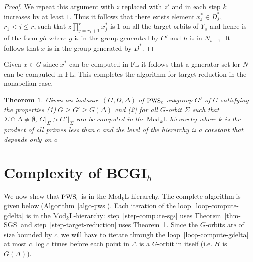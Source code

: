 \documentclass[11pt]{madras}%
\newtheorem{theorem}{Theorem}[chapter]
\theoremstyle{remark}
\newcommand{\ModkL}[1]{{\ensuremath{\mathrm{Mod}_{#1}\mathrm{L}}}}
\newcommand{\ProblemFont}[1]{{\ensuremath{\textrm{\small #1}}}}
\newcommand{\pr}[2]{{\ensuremath{\left.{#1}\right\vert_{#2}}}}
\newcommand{\pointwise}[2]{{\ensuremath{#1\left(#2\right)}}}
\begin{document}
\begin{proof}
  We repeat this argument with $z$ replaced with $z'$ and in each step
  $k$ increases by at least $1$. Thus it follows that there exists
  element $x_j^* \in D_j^*$, $r_1 < j \leq r$, such that $z \prod_{j =
    r_1 +1}^r x_j^*$ is $1$ on all the target orbits of $Y_s$ and
  hence is of the form $gh$ where $g$ is in the group generated by
  $C'$ and $h$ is in $N_{s+1}$.  It follows that $x$ is in the group
  generated by $D^*$.

\end{proof}

Given $x \in G$ since $x^*$ can be computed in $\mathrm{FL}$ it
follows that a generator set for $N$ can be computed in $\mathrm{FL}$.
This completes the algorithm for target reduction in the nonabelian
case. 



\begin{theorem}\label{thm-target-reduction}
  Given an instance $(G,\Omega,\Delta)$ of $\ProblemFont{PWS}_c$
  subgroup $G'$ of $G$ satisfying the properties (1) $G \geq G' \geq
  \pointwise{G}{\Delta}$ and (2) for all $G$-orbit $\Sigma$ such that
  $\Sigma \cap \Delta \neq \emptyset$, $\pr{G}{\Sigma} >
  \pr{G'}{\Sigma}$ can be computed in the $\ModkL{k}$ hierarchy where
  $k$ is the product of all primes less than $c$ and the level of the
  hierarchy is a constant that depends only on $c$.
\end{theorem}
\section{Complexity of {\small BCGI$_b$}}


We now show that $\ProblemFont{PWS}_c$ is in the
$\ModkL{k}$-hierarchy.  The complete algorithm is given below
(Algorithm~\ref{algo-pws}).  Each iteration of the
loop~\ref{loop-compute-gdelta} is in the $\ModkL{k}$-hierarchy:
step~\ref{step-compute-sgs} uses Theorem~\ref{thm-SGS} and
step~\ref{step-target-reduction} uses
Theorem~\ref{thm-target-reduction}. Since the $G$-orbits are of size
bounded by $c$, we will have to iterate through the
loop~\ref{loop-compute-gdelta} at most $c.\log{c}$ times before each
point in $\Delta$ is a $G$-orbit in itself (i.e. $H$ is
$\pointwise{G}{\Delta}$).
\end{document}
